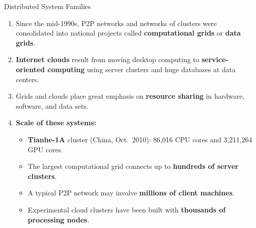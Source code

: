 \begin{frame}{Distributed System Families}
\begin{enumerate}
\item<1-> Since the mid-1990s, P2P networks and networks of clusters were consolidated into national projects called \textbf{computational grids} or \textbf{data grids}.
\item<2-> \textbf{Internet clouds} result from moving desktop computing to \textbf{service-oriented computing} using server clusters and huge databases at data centers.
\item<3-> Grids and clouds place great emphasis on \textbf{resource sharing} in hardware, software, and data sets.
\item<4-> \textbf{Scale of these systems:}
    \begin{itemize}
    \item \textbf{Tianhe-1A} cluster (China, Oct.\ 2010): 86,016 CPU cores and 3,211,264 GPU cores.
    \item The largest computational grid connects up to \textbf{hundreds of server clusters}.
    \item A typical P2P network may involve \textbf{millions of client machines}.
    \item Experimental cloud clusters have been built with \textbf{thousands of processing nodes}.
    \end{itemize}
\end{enumerate}
\end{frame}

